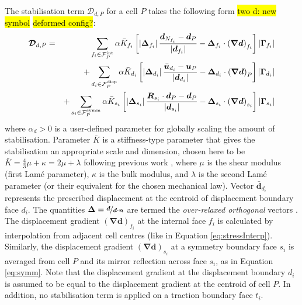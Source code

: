 \documentclass[sn-mathphys,Numbered]{sn-jnl}%
\newcommand{\bb}{\boldsymbol}
\begin{document}
The stabilisation term  $\bb{\mathcal{D}}_{d,P}$ for a cell $P$ takes the following form \hl{two d: new symbol} \hl{deformed config?}:
\begin{eqnarray} \label{eq:RhieChow}
	\bb{\mathcal{D}}_{d,P}
	&=& \sum_{f_i \in \mathcal{F}^{\text{int}}_P} \alpha \bar{K}_{f_i} \left[
		\left|\bb{\Delta}_{f_i} \right| \frac{ \bb{d}_{N_{f_i}} - \bb{d}_P}{\left|\bb{d}_{f_i}\right|}	- \bb{\Delta}_{f_i} \cdot \left(\bb{\nabla} \bb{d} \right)_{f_i}
		\right]    \left|\bb{\Gamma}_{f_i}\right| \notag \\
	&&+ \sum_{d_i \in \mathcal{F}^{\text{disp}}_P} \alpha \bar{K}_{d_i} \left[
		\left|\bb{\Delta}_{d_i} \right| \frac{ \bar{\bb{u}}_{d_i} - \bb{u}_P}{\left|\bb{d}_{d_i}\right|}	- \bb{\Delta}_{d_i} \cdot \left(\bb{\nabla} \bb{d} \right)_{P}
		\right]    \left|\bb{\Gamma}_{d_i}\right| \notag \\
	&&+ \sum_{s_i \in \mathcal{F}^{\text{symm}}_P} \alpha \bar{K}_{s_i} \left[
		\left|\bb{\Delta}_{s_i} \right| \frac{ \bb{R}_{s_i} \cdot \bb{d}_{P} - \bb{d}_P}{\left|\bb{d}_{s_i}\right|} - \bb{\Delta}_{s_i} \cdot \left(\bb{\nabla} \bb{d} \right)_{s_i}
		\right]    \left|\bb{\Gamma}_{s_i}\right|
\end{eqnarray}
where $\alpha_d > 0$ is a user-defined parameter for globally scaling the amount of stabilisation.
Parameter $\bar{K}$ is a stiffness-type parameter that gives the stabilisation an appropriate scale and dimension, chosen here to be $\bar{K} = \frac{4}{3}\mu + \kappa = 2\mu + \lambda$ following previous work \cite{Jasak2000, Cardiff2017, Cardiff2018}, where $\mu$ is the shear modulus (first Lam\'{e} parameter), $\kappa$ is the bulk modulus, and $\lambda$ is the second Lam\'{e} parameter (or their equivalent for the chosen mechanical law).
Vector $\bar{\bb{d}}_{d_i}$ represents the prescribed displacement at the centroid of displacement boundary face $d_i$.
The quantities $\bb{\Delta} = \nicefrac{\bb{d}}{\bb{d} \cdot \bb{n}}$ are termed the \emph{over-relaxed orthogonal} vectors \cite{Jasak1996}.
The displacement gradient $\left(\bb{\nabla} \bb{d} \right)_{f_i}$ at the internal face $f_i$ is calculated by interpolation from adjacent cell centres (like in Equation \ref{eq:stressInterp}).
Similarly, the displacement gradient $\left(\bb{\nabla} \bb{d} \right)_{s_i}$ at a symmetry boundary face $s_i$ is averaged from cell $P$ and its mirror reflection across face $s_i$, as in Equation \ref{eq:symm}.
Note that the displacement gradient at the displacement boundary $d_i$ is assumed to be equal to the displacement gradient at the centroid of cell $P$.
In addition, no stabilisation term is applied on a traction boundary face $t_i$.
\end{document}
